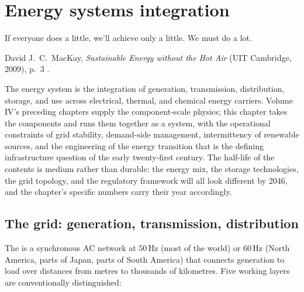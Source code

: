 \chapter{Energy systems integration}
\label{vol04:ch14}

\epigraph{If everyone does a little, we'll achieve only a little. We
must do a lot.}{David J.\ C.\ MacKay, \emph{Sustainable Energy without
the Hot Air} (UIT Cambridge, 2009), p.~3
\cite[p.~3]{gen:mackay2009}.}


\noindent
The energy system is the integration of generation, transmission,
distribution, storage, and use across electrical, thermal, and
chemical energy carriers. Volume IV's preceding chapters supply the
component-scale physics; this chapter takes the components and runs
them together as a system, with the operational constraints of grid
stability, demand-side management, intermittency of renewable
sources, and the engineering of the energy transition that is the
defining infrastructure question of the early twenty-first century.
The half-life of the contents is medium rather than durable: the
energy mix, the storage technologies, the grid topology, and the
regulatory framework will all look different by 2046, and the
chapter's specific numbers carry their year accordingly.

\section{The grid: generation, transmission, distribution}

The  is a synchronous AC network at
$50\,\si{\hertz}$ (most of the world) or $60\,\si{\hertz}$ (North
America, parts of Japan, parts of South America) that connects
generation to load over distances from metres to thousands of
kilometres. Five working layers are conventionally distinguished:

